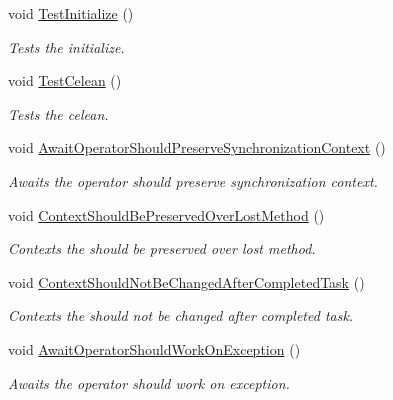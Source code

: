 \begin{DoxyCompactItemize}
\item 
void \hyperlink{class_minimu_async_bridge_unit_test_1_1_unit_test_sychronization_context_a9ae6d6e3f4c5dc592a0712f18e0e9df4}{Test\+Initialize} ()
\begin{DoxyCompactList}\small\item\em Tests the initialize. \end{DoxyCompactList}\item 
void \hyperlink{class_minimu_async_bridge_unit_test_1_1_unit_test_sychronization_context_abd853d2d2cf86c19612115b31304319e}{Test\+Celean} ()
\begin{DoxyCompactList}\small\item\em Tests the celean. \end{DoxyCompactList}\item 
void \hyperlink{class_minimu_async_bridge_unit_test_1_1_unit_test_sychronization_context_a948f30fe7ec5091ccc0e230cb60a967c}{Await\+Operator\+Should\+Preserve\+Synchronization\+Context} ()
\begin{DoxyCompactList}\small\item\em Awaits the operator should preserve synchronization context. \end{DoxyCompactList}\item 
void \hyperlink{class_minimu_async_bridge_unit_test_1_1_unit_test_sychronization_context_a233cac2f58566a1202d3a41397e460e8}{Context\+Should\+Be\+Preserved\+Over\+Lost\+Method} ()
\begin{DoxyCompactList}\small\item\em Contexts the should be preserved over lost method. \end{DoxyCompactList}\item 
void \hyperlink{class_minimu_async_bridge_unit_test_1_1_unit_test_sychronization_context_abd4229930c456bce16a3a217bf1d2a9c}{Context\+Should\+Not\+Be\+Changed\+After\+Completed\+Task} ()
\begin{DoxyCompactList}\small\item\em Contexts the should not be changed after completed task. \end{DoxyCompactList}\item 
void \hyperlink{class_minimu_async_bridge_unit_test_1_1_unit_test_sychronization_context_a93ed04f39c895cad8312dd7956cbdb1c}{Await\+Operator\+Should\+Work\+On\+Exception} ()
\begin{DoxyCompactList}\small\item\em Awaits the operator should work on exception. \end{DoxyCompactList}\end{DoxyCompactItemize}


